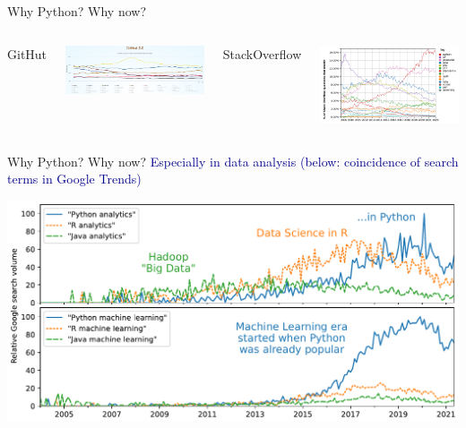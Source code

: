 \documentclass[aspectratio=169]{beamer}
\begin{document}
\begin{frame}{Why Python? Why now?}
\vspace{0.25 cm}
\begin{columns}[t]
\centering GitHut

\vspace{0.1 cm}
\includegraphics[width=\linewidth]{python-rankings-githut-2022.png}

\centering StackOverflow

\vspace{0.1 cm}
\includegraphics[width=\linewidth]{python-rankings-stackoverflow-2022.png}
\end{columns}
\end{frame}

\begin{frame}{Why Python? Why now?}
\large
\vspace{0.25 cm}
\textcolor{darkblue}{\mbox{\hspace{-0.5 cm}}Especially in data analysis (below: coincidence of search terms in Google Trends)}

\vspace{0.15 cm}
\includegraphics[width=\linewidth]{analytics-by-language.pdf}
\end{frame}
\end{document}
